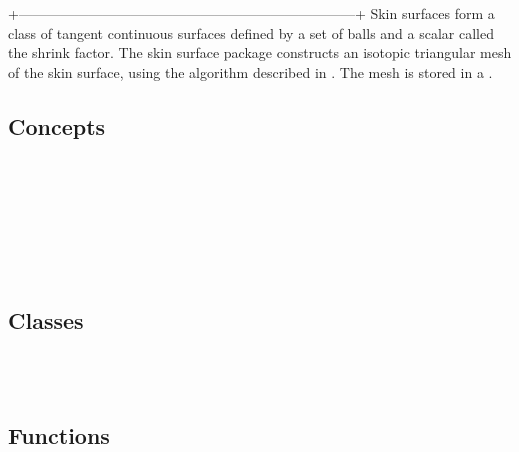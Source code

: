 
\label{chapterSkinSurfaceRef}

%
+------------------------------------------------------------------------+
Skin surfaces form a class of tangent continuous surfaces defined by a
set of balls and a scalar called the shrink factor. The skin surface
package constructs an isotopic triangular mesh of the skin surface,
using the algorithm described in \cite{cgal:kv-mssct-05}. The mesh is
stored in a . 

\subsection*{Concepts}
\\
\\
\\

\\
\\
\\


\subsection*{Classes}
\\
\\


\subsection*{Functions}
\\
\\


